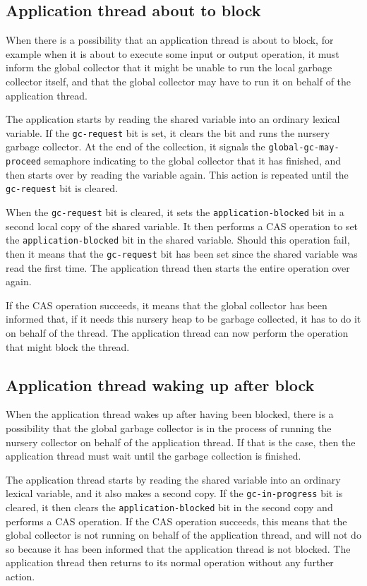 \subsection{Application thread about to block}

When there is a possibility that an application thread is about to
block, for example when it is about to execute some input or output
operation,  it must inform the global collector that it might be
unable to run the local garbage collector itself, and that the global
collector may have to run it on behalf of the application thread.

The application starts by reading the shared variable into an ordinary
lexical variable.  If the \texttt{gc-request} bit is set, it clears
the bit and runs the nursery garbage collector.  At the end of the
collection, it signals the \texttt{global-gc-may-proceed} semaphore
indicating to the global collector that it has finished, and then
starts over by reading the variable again.  This action is repeated
until the \texttt{gc-request} bit is cleared.

When the \texttt{gc-request} bit is cleared, it sets the
\texttt{application-blocked} bit in a second local copy of the shared
variable.  It then performs a CAS operation to set the
\texttt{application-blocked} bit in the shared variable.  Should this
operation fail, then it means that the \texttt{gc-request} bit has
been set since the shared variable was read the first time.  The
application thread then starts the entire operation over again.

If the CAS operation succeeds, it means that the global collector has
been informed that, if it needs this nursery heap to be garbage
collected, it has to do it on behalf of the thread.  The application
thread can now perform the operation that might block the thread.

\subsection{Application thread waking up after block}

When the application thread wakes up after having been blocked, there
is a possibility that the global garbage collector is in the process
of running the nursery collector on behalf of the application thread.
If that is the case, then the application thread must wait until the
garbage collection is finished.

The application thread starts by reading the shared variable into an
ordinary lexical variable, and it also makes a second copy.  If the
\texttt{gc-in-progress} bit is cleared, it then clears the
\texttt{application-blocked} bit in the second copy and performs a CAS
operation.  If the CAS operation succeeds, this means that the global
collector is not running on behalf of the application thread, and will
not do so because it has been informed that the application thread is
not blocked.  The application thread then returns to its normal
operation without any further action.

